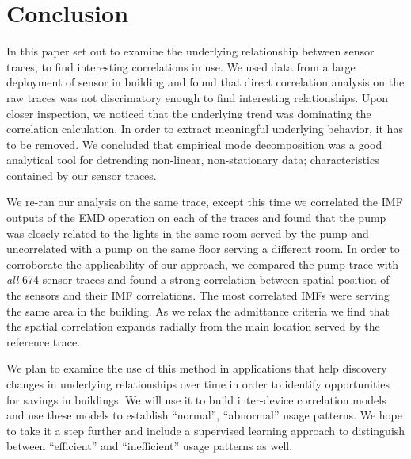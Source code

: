 



\section{Conclusion}





In this paper set out to examine the underlying relationship between sensor traces, to find interesting correlations
in use.  We used data from a large deployment of sensor in building and found that direct correlation analysis on the raw
traces was not discrimatory enough to find interesting relationships.  Upon closer inspection, we noticed that
the underlying trend was dominating the correlation calculation.  In order to extract meaningful underlying behavior, it has
to be removed.  We concluded that empirical mode decomposition was a good analytical tool for detrending 
non-linear, non-stationary data; characteristics contained by our sensor traces.

We re-ran our analysis on the same trace, except this time we correlated the IMF outputs of the EMD operation on each of the traces and found that the pump was closely related to the lights in the same room served by the pump and
uncorrelated with a pump on the same floor serving a different room.  In order to corroborate the applicability
of our approach, we compared the pump trace with \emph{all} 674 sensor traces and found a strong correlation
between spatial position of the sensors and their IMF correlations.  The most correlated IMFs were serving the same
area in the building.  As we relax the admittance criteria we find that the spatial correlation expands radially from
the main location served by the reference trace.

We plan to examine the use of this method in applications that help discovery changes in underlying relationships over time
in order to identify opportunities for savings in buildings.  We will use it to build inter-device correlation models
and use these models to establish ``normal'', ``abnormal'' usage patterns.  We hope to take it a step further and include a
supervised learning approach to distinguish between ``efficient'' and ``inefficient'' usage patterns as well.






